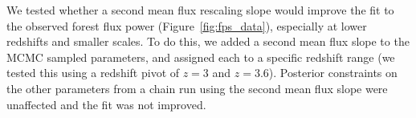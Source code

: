 We tested whether a second mean flux rescaling slope would improve the fit to the observed \lya forest flux power (Figure~\ref{fig:fps_data}), especially at lower redshifts and smaller scales.
To do this, we added a second mean flux slope to the MCMC sampled parameters, and assigned each to a specific redshift range (we tested this using a redshift pivot of $z=3$ and $z=3.6$).
Posterior constraints on the other parameters from a chain run using the second mean flux slope were unaffected and the fit was not improved.
